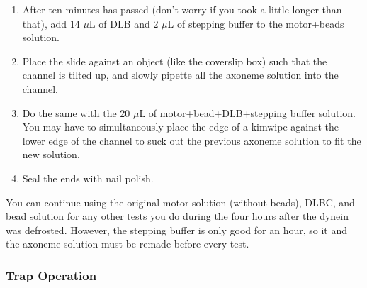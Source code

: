 \documentclass{../lab}
\begin{document}
\begin{enumerate}
\begin{itemize}
        \item 1 $\mu$L PCD
    
        \item 1 $\mu$L ATP
    
        \item 1 $\mu$L DTT
    
        \item 2.5 $\mu$L DLB
    
        \item 3.5 $\mu$L Casein
    \end{itemize}

    \item After ten minutes has passed (don't worry if you took a little longer than that), add 14 $\mu$L of DLB and 2 $\mu$L of stepping buffer to the motor+beads solution.

    \item Place the slide against an object (like the coverslip box) such that the channel is tilted up, and slowly pipette all the axoneme solution into the channel.

    \item Do the same with the 20 $\mu$L of motor+bead+DLB+stepping buffer solution. You may have to simultaneously place the edge of a kimwipe against the lower edge of the channel to suck out the previous axoneme solution to fit the new solution.

    \item Seal the ends with nail polish.
\end{enumerate}

You can continue using the original motor solution (without beads), DLBC, and bead solution for any other tests you do during the four hours after the dynein was defrosted. However, the stepping buffer is only good for an hour, so it and the axoneme solution must be remade before every test.

\subsubsection{Trap Operation}
\end{document}
